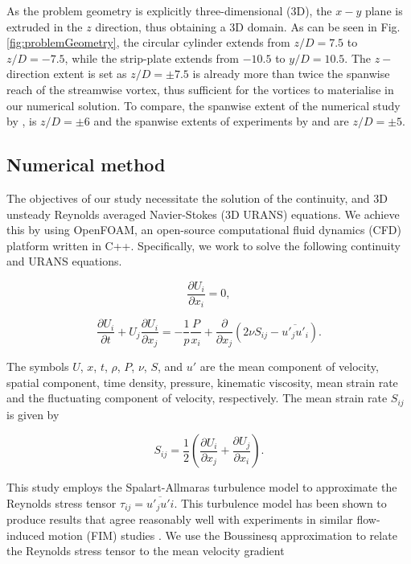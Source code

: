 \documentclass[a4paper,fleqn]{cas-sc}
\begin{document}
As the problem geometry is explicitly three-dimensional (3D), the $x-y$ plane is extruded in the $z$ direction, thus obtaining a 3D domain. As can be seen in Fig. \ref{fig:problemGeometry}, the circular cylinder extends from $z/D=7.5$ to $z/D=-7.5$, while the strip-plate extends from $-10.5$ to $y/D=10.5$. The $z-$direction extent is set as $z/D=\pm7.5$ is already more than twice the spanwise reach of the streamwise vortex, thus sufficient for the vortices to materialise in our numerical solution. To compare, the spanwise extent of the numerical study by \citet{Deng2007}, is $z/D=\pm6$ and the spanwise extents of experiments by \citet{Nguyen2012} and \citet{Koide2013} are $z/D=\pm5$.

\subsection{Numerical method} \label{ssec:numMeth}
The objectives of our study necessitate the solution of the continuity, and 3D unsteady Reynolds averaged Navier-Stokes (3D URANS) equations. We achieve this by using OpenFOAM, an open-source computational fluid dynamics (CFD) platform written in C++. Specifically, we work to solve the following continuity and URANS equations.

\begin{equation}
  \frac{\partial U_{i}}{\partial x_{i}}=0,
  \label{eq:continuity}
\end{equation}

\begin{equation}
  \frac{\partial U_{i}}{\partial t}+U_{j}\frac{\partial U_{i}}{\partial x_{j}} = -\frac{1}{p}\frac{P}{x_{i}}+\frac{\partial}{\partial x_{j}} \left( 2\nu S_{ij}-\overline{u'_{j}u'_{i}} \right).
  \label{eq:navier-stokes}
\end{equation}

The symbols $U$, $x$, $t$, $\rho$, $P$, $\nu$, $S$, and $u'$ are the mean component of velocity, spatial component, time density, pressure, kinematic viscosity, mean strain rate and the fluctuating component of velocity, respectively. The mean strain rate $S_{ij}$ is given by

\begin{equation}
  S_{ij} = \frac{1}{2} \left( \frac{\partial U_{i}}{\partial x_{j}} + \frac{\partial U_{j}}{\partial x_{i}} \right).
  \label{eq:sij}
\end{equation}

This study employs the Spalart-Allmaras turbulence model to approximate the Reynolds stress tensor $\tau_{ij} = \overline{u'_{j}u'{i}}$. This turbulence model has been shown to produce results that agree reasonably well with experiments in similar flow-induced motion (FIM) studies \citep{Ding2015a,Ding2015b}. We use the Boussinesq approximation to relate the Reynolds stress tensor to the mean velocity gradient
\end{document}
